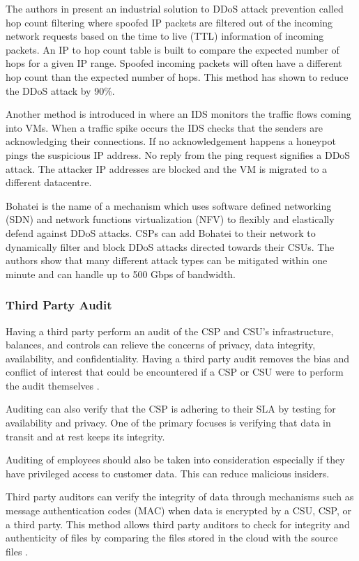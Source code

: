 \documentclass[12pt]{article}
\begin{document}
The authors in \cite{jin2003hop} present an industrial solution to DDoS attack prevention called hop count filtering where spoofed IP packets are filtered out of the incoming network requests based on the time to live (TTL) information of incoming packets. An IP to hop count table is built to compare the expected number of hops for a given IP range. Spoofed incoming packets will often have a different hop count than the expected number of hops. This method has shown to reduce the DDoS attack by 90\%.

Another method is introduced in \cite{bakshi2010securing} where an IDS monitors the traffic flows coming into VMs. When a traffic spike occurs the IDS checks that the senders are acknowledging their connections. If no acknowledgement happens a honeypot pings the suspicious IP address. No reply from the ping request signifies a DDoS attack. The attacker IP addresses are blocked and the VM is migrated to a different datacentre.

Bohatei \cite{fayaz2015bohatei} is the name of a mechanism which uses software defined networking (SDN) and network functions virtualization (NFV) to flexibly and elastically defend against DDoS attacks. CSPs can add Bohatei to their network to dynamically filter and block DDoS attacks directed towards their CSUs. The authors show that many different attack types can be mitigated within one minute and can handle up to 500 Gbps of bandwidth.


\subsubsection{Third Party Audit}

Having a third party perform an audit of the CSP and CSU's infrastructure, balances, and controls can relieve the concerns of privacy, data integrity, availability, and confidentiality. Having a third party audit removes the bias and conflict of interest that could be encountered if a CSP or CSU were to perform the audit themselves \cite{liu2015survey}.

Auditing can also verify that the CSP is adhering to their SLA by testing for availability and privacy. One of the primary focuses is verifying that data in transit and at rest keeps its integrity.

Auditing of employees should also be taken into consideration especially if they have privileged access to customer data. This can reduce malicious insiders.

Third party auditors can verify the integrity of data through mechanisms such as message authentication codes (MAC) when data is encrypted by a CSU, CSP, or a third party. This method allows third party auditors to check for integrity and authenticity of files by comparing the files stored in the cloud with the source files \cite{wang2010toward}.
\end{document}
